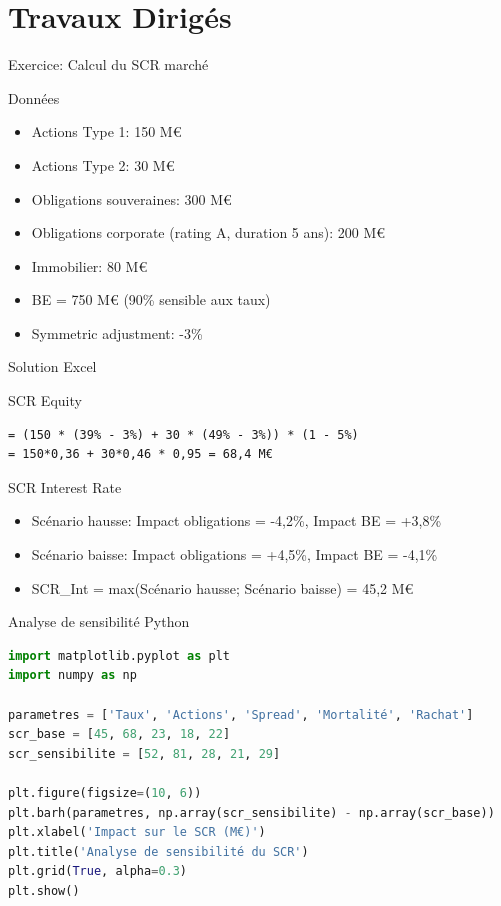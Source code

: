 \documentclass[10pt,aspectratio=169]{beamer}
\begin{document}
\section{Travaux Dirigés}
\begin{frame}{Exercice: Calcul du SCR marché}
\begin{exampleblock}{Données}
\begin{itemize}
\item Actions Type 1: 150 M€
\item Actions Type 2: 30 M€
\item Obligations souveraines: 300 M€
\item Obligations corporate (rating A, duration 5 ans): 200 M€
\item Immobilier: 80 M€
\item BE = 750 M€ (90\% sensible aux taux)
\item Symmetric adjustment: -3\%
\end{itemize}
\end{exampleblock}
\end{frame}

\begin{frame}[fragile]{Solution Excel}
\begin{block}{SCR Equity}
\begin{lstlisting}[language=Excel]
= (150 * (39% - 3%) + 30 * (49% - 3%)) * (1 - 5%)
= 150*0,36 + 30*0,46 * 0,95 = 68,4 M€
\end{lstlisting}
\end{block}

\begin{block}{SCR Interest Rate}
\begin{itemize}
\item Scénario hausse: Impact obligations = -4,2\%, Impact BE = +3,8\%
\item Scénario baisse: Impact obligations = +4,5\%, Impact BE = -4,1\%
\item SCR\_Int = max(Scénario hausse; Scénario baisse) = 45,2 M€
\end{itemize}
\end{block}
\end{frame}

\begin{frame}[fragile]{Analyse de sensibilité Python}
\begin{lstlisting}[language=Python]
import matplotlib.pyplot as plt
import numpy as np

parametres = ['Taux', 'Actions', 'Spread', 'Mortalité', 'Rachat']
scr_base = [45, 68, 23, 18, 22]
scr_sensibilite = [52, 81, 28, 21, 29]

plt.figure(figsize=(10, 6))
plt.barh(parametres, np.array(scr_sensibilite) - np.array(scr_base))
plt.xlabel('Impact sur le SCR (M€)')
plt.title('Analyse de sensibilité du SCR')
plt.grid(True, alpha=0.3)
plt.show()
\end{lstlisting}
\end{frame}
\end{document}
